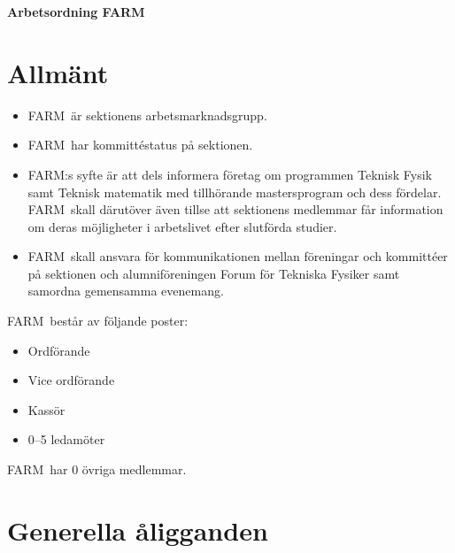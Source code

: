 

\renewcommand{\dateseparator}{-} %

\renewcommand{\forening}{FARM}

\begin{center}
\LARGE{\textbf{Arbetsordning \forening}}
\end{center}





\section{Allmänt}
\begin{itemize}
\item \forening \ är sektionens arbetsmarknadsgrupp. 
\item \forening \ har kommittéstatus på sektionen.
\item \forening:s syfte är att dels informera företag om programmen Teknisk Fysik samt Teknisk matematik med tillhörande mastersprogram och dess fördelar. \forening \ skall därutöver även tillse att sektionens medlemmar får information om deras möjligheter i arbetslivet efter slutförda studier.\
\item \forening \ skall ansvara för kommunikationen mellan föreningar och kommittéer på sektionen och alumniföreningen Forum för Tekniska Fysiker samt samordna gemensamma evenemang.\\
\end{itemize}

\forening \ består av följande poster:
\begin{itemize}
\item Ordförande
\item Vice ordförande
\item Kassör
\item 0--5 ledamöter
\end{itemize}

\forening \ har 0 övriga medlemmar. 

\section{Generella åligganden}

